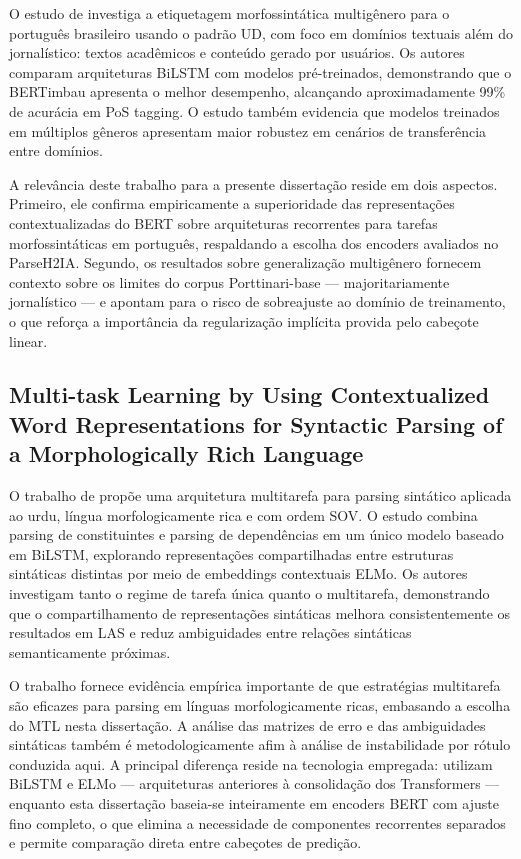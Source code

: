 O estudo de \citeauthor{stilpetrogold} investiga a etiquetagem morfossintática multigênero
para o português brasileiro usando o padrão UD, com foco em domínios textuais além do
jornalístico: textos acadêmicos e conteúdo gerado por usuários. Os autores comparam
arquiteturas BiLSTM com modelos pré-treinados, demonstrando que o BERTimbau apresenta o
melhor desempenho, alcançando aproximadamente 99\% de acurácia em PoS tagging. O estudo
também evidencia que modelos treinados em múltiplos gêneros apresentam maior robustez em
cenários de transferência entre domínios.

A relevância deste trabalho para a presente dissertação reside em dois aspectos. Primeiro,
ele confirma empiricamente a superioridade das representações contextualizadas do BERT sobre
arquiteturas recorrentes para tarefas morfossintáticas em português, respaldando a escolha
dos encoders avaliados no ParseH2IA. Segundo, os resultados sobre generalização multigênero
fornecem contexto sobre os limites do corpus Porttinari-base — majoritariamente jornalístico
— e apontam para o risco de sobreajuste ao domínio de treinamento, o que reforça a
importância da regularização implícita provida pelo cabeçote linear.

\subsection*{Multi-task Learning by Using Contextualized Word Representations
             for Syntactic Parsing of a Morphologically Rich Language}

O trabalho de \citeauthor{ehsan2025multi} propõe uma arquitetura multitarefa para parsing
sintático aplicada ao urdu, língua morfologicamente rica e com ordem SOV. O estudo combina
parsing de constituintes e parsing de dependências em um único modelo baseado em BiLSTM,
explorando representações compartilhadas entre estruturas sintáticas distintas por meio de
embeddings contextuais ELMo. Os autores investigam tanto o regime de tarefa única quanto o
multitarefa, demonstrando que o compartilhamento de representações sintáticas melhora
consistentemente os resultados em LAS e reduz ambiguidades entre relações sintáticas
semanticamente próximas.

O trabalho fornece evidência empírica importante de que estratégias multitarefa são eficazes
para parsing em línguas morfologicamente ricas, embasando a escolha do MTL nesta dissertação.
A análise das matrizes de erro e das ambiguidades sintáticas também é metodologicamente afim
à análise de instabilidade por rótulo conduzida aqui. A principal diferença reside na
tecnologia empregada: \citeauthor{ehsan2025multi} utilizam BiLSTM e ELMo — arquiteturas
anteriores à consolidação dos Transformers — enquanto esta dissertação baseia-se
inteiramente em encoders BERT com ajuste fino completo, o que elimina a necessidade de
componentes recorrentes separados e permite comparação direta entre cabeçotes de predição.

